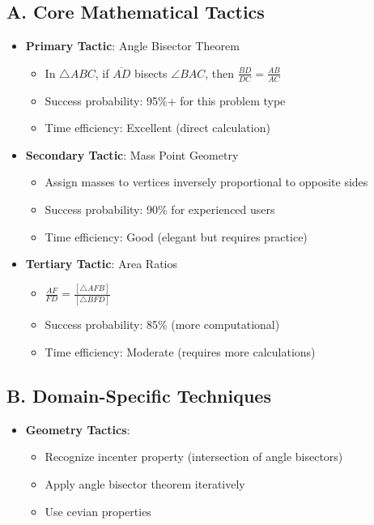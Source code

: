 \documentclass[12pt]{article}
\begin{document}
\begin{tacticalbox}
\subsection*{A. Core Mathematical Tactics}
\begin{itemize}[leftmargin=*]
    \item \textbf{Primary Tactic}: Angle Bisector Theorem
    \begin{itemize}
        \item In $\triangle ABC$, if $\overline{AD}$ bisects $\angle BAC$, then $\frac{BD}{DC} = \frac{AB}{AC}$
        \item Success probability: 95\%+ for this problem type
        \item Time efficiency: Excellent (direct calculation)
    \end{itemize}
    
    \item \textbf{Secondary Tactic}: Mass Point Geometry
    \begin{itemize}
        \item Assign masses to vertices inversely proportional to opposite sides
        \item Success probability: 90\% for experienced users
        \item Time efficiency: Good (elegant but requires practice)
    \end{itemize}
    
    \item \textbf{Tertiary Tactic}: Area Ratios
    \begin{itemize}
        \item $\frac{AF}{FD} = \frac{[\triangle AFB]}{[\triangle BFD]}$
        \item Success probability: 85\% (more computational)
        \item Time efficiency: Moderate (requires more calculations)
    \end{itemize}
\end{itemize}

\subsection*{B. Domain-Specific Techniques}
\begin{itemize}[leftmargin=*]
    \item \textbf{Geometry Tactics}:
    \begin{itemize}
        \item Recognize incenter property (intersection of angle bisectors)
        \item Apply angle bisector theorem iteratively
        \item Use cevian properties
    \end{itemize}
    

\end{itemize}
\end{tacticalbox}
\end{document}
